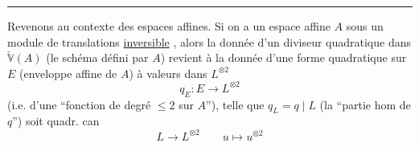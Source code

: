 \begin{center}\rule{1.8em}{0.4pt}\end{center}

Revenons au contexte des espaces affines. Si on a un espace affine $A$ sous un module de translations \uline{inversible} , alors la donnée d'un diviseur quadratique dans $\check{\mathbb V}(A)$ (le schéma   défini par $A$) revient à la donnée d'une forme quadratique sur $E$ (enveloppe affine de $A$) à valeurs dans $L^{\otimes2}$
\[
q_E:E\longrightarrow L^{\otimes2}
\]
(i.e. d'une ``fonction   de degré $\leq2$ sur $A$''), telle que $q_L=q\mid L$ (la ``partie hom de $q$'') soit   quadr. can
\[
L\longrightarrow L^{\otimes2}\qquad u\longmapsto u^{\otimes2}
\]

